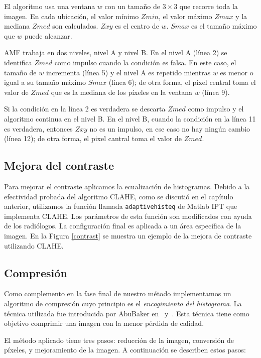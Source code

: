 El algoritmo usa una ventana $w$ con un tamaño de $3\times3$ que recorre toda
la imagen. En cada ubicación, el valor mínimo $Zmin$, el valor máximo $Zmax$ y
la mediana $Zmed$ son calculados. $Zxy$ es el centro de $w$. $Smax$ es el tamaño
máximo que $w$ puede alcanzar.

AMF trabaja en dos niveles, nivel A y nivel B. En el nivel A (línea 2) se
identifica $Zmed$ como impulso cuando la condición es falsa. En este caso, el
tamaño de $w$ incrementa (línea 5) y el nivel A es repetido mientras $w$ es
menor o igual a su tamaño máximo $Smax$ (línea 6); de otra forma, el pixel
central toma el valor de $Zmed$ que es la mediana de los píxeles en la ventana
$w$ (línea 9).

Si la condición en la línea 2 es verdadera se descarta $Zmed$ como impulso y el
algoritmo continua en el nivel B. En el nivel B, cuando la condición en la
línea 11 es verdadera, entonces $Zxy$ no es un impulso, en ese caso no hay
ningún cambio (línea 12); de otra forma, el pixel cantral toma el valor de
$Zmed$.

\subsection{Mejora del contraste}

Para mejorar el contraste aplicamos la ecualización de histogramas. Debido a la
efectividad probada del algoritmo CLAHE, como se discutió en el capítulo
anterior, utilizamos la función llamada \texttt{adaptivehisteq} de Matlab IPT
que implementa CLAHE. Los parámetros de esta función son modificados con ayuda
de los radiólogos. La configuración final es aplicada a un área específica de
la imagen. En la Figura \ref{contrast} se muestra un ejemplo de la mejora de
contraste utilizando CLAHE.

\subsection{Compresión}
\label{compression}

Como complemento en la fase final de nuestro método implementamos un algoritmo
de compresión cuyo principio es el \textit{encogimiento del histograma}. La
técnica utilizada fue introducida por AbuBaker en~\cite{abubaker2006mammogram}
y~\cite{abubaker2007efficient}. Esta técnica tiene como objetivo comprimir una
imagen con la menor pérdida de calidad.

El método aplicado tiene tres pasos: reducción de la imagen, conversión de
píxeles, y mejoramiento de la imagen. A continuación se describen estos pasos:

